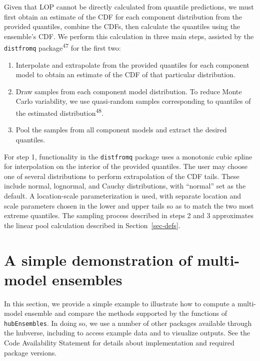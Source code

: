 \documentclass[
  letterpaper,
  DIV=11,
  numbers=noendperiod]{scrartcl}
\providecommand{\tightlist}{%
  \setlength{\itemsep}{0pt}\setlength{\parskip}{0pt}}\usepackage{longtable,booktabs,array}
\begin{document}
Given that LOP cannot be directly calculated from quantile predictions,
we must first obtain an estimate of the CDF for each component
distribution from the provided quantiles, combine the CDFs, then
calculate the quantiles using the ensemble's CDF. We perform this
calculation in three main steps, assisted by the \texttt{distfromq}
package\textsuperscript{47} for the first two:

\begin{enumerate}
\def\labelenumi{\arabic{enumi}.}
\tightlist
\item
  Interpolate and extrapolate from the provided quantiles for each
  component model to obtain an estimate of the CDF of that particular
  distribution.
\item
  Draw samples from each component model distribution. To reduce Monte
  Carlo variability, we use quasi-random samples corresponding to
  quantiles of the estimated distribution\textsuperscript{48}.
\item
  Pool the samples from all component models and extract the desired
  quantiles.
\end{enumerate}

For step 1, functionality in the \texttt{distfromq} package uses a
monotonic cubic spline for interpolation on the interior of the provided
quantiles. The user may choose one of several distributions to perform
extrapolation of the CDF tails. These include normal, lognormal, and
Cauchy distributions, with ``normal'' set as the default. A
location-scale parameterization is used, with separate location and
scale parameters chosen in the lower and upper tails so as to match the
two most extreme quantiles. The sampling process described in steps 2
and 3 approximates the linear pool calculation described in
Section~\ref{sec-defs}.

\section{A simple demonstration of multi-model
ensembles}\label{sec-simple-ex}

In this section, we provide a simple example to illustrate how to
compute a multi-model ensemble and compare the methods supported by the
functions of \texttt{hubEnsembles}. In doing so, we use a number of
other packages available through the hubverse, including to access
example data and to visualize outputs. See the Code Availability
Statement for details about implementation and required package
versions.
\end{document}
